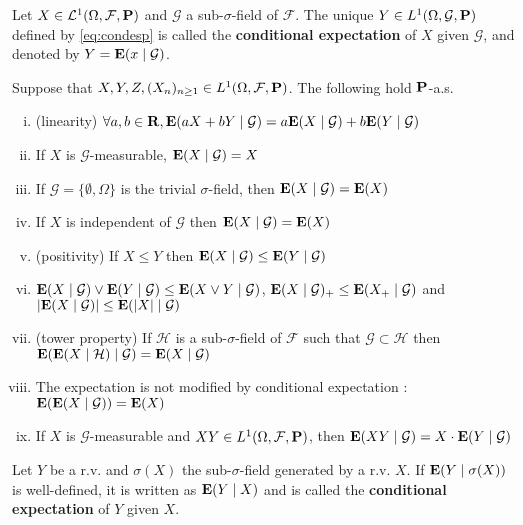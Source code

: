 	\begin{defn}
		Let $X \in \mathcal{L}^1(\Omega, \mathcal{F}, \mathbf{P})$ and $\mathcal{G}$ a sub-$\sigma$-field of $\mathcal{F}$.
		The unique $Y \in L^1(\Omega, \mathcal{G}, \mathbf{P})$ defined by \eqref{eq:condesp} is called the \textbf{conditional expectation} of $X$ given $\mathcal{G}$, and denoted by $Y = \mathbf{E}(x \mid \mathcal{G})$.
	\end{defn}

	\begin{pop}
		Suppose that $X, Y, Z, (X_n)_{n \geq 1} \in L^1(\Omega, \mathcal{F}, \mathbf{P})$.
		The following hold $\mathbf{P}$-a.s.
		\begin{enumerate}[(i)]
			\item (linearity) $\forall a, b \in \mathbf{R}, \mathbf{E}(aX + bY \mid \mathcal{G}) = a \mathbf{E}(X \mid \mathcal{G}) + b \mathbf{E}(Y \mid \mathcal{G})$
			\item If $X$ is $\mathcal{G}$-measurable, $\mathbf{E}(X \mid \mathcal{G}) = X$
			\item If $\mathcal{G} = \{ \emptyset, \Omega \}$ is the trivial $\sigma$-field, then $\mathbf{E}(X \mid \mathcal{G}) = \mathbf{E}(X)$
			\item If $X$ is independent of $\mathcal{G}$ then $\mathbf{E}(X \mid \mathcal{G}) = \mathbf{E}(X)$
			\item (positivity) If $X \leq Y$ then $\mathbf{E}(X \mid \mathcal{G}) \leq \mathbf{E}(Y \mid \mathcal{G})$
			\item $\mathbf{E}(X \mid \mathcal{G}) \vee \mathbf{E}(Y \mid \mathcal{G}) \leq \mathbf{E}(X \vee Y \mid \mathcal{G})$,
				$\mathbf{E}(X \mid \mathcal{G})_+ \leq \mathbf{E}(X_+ \mid \mathcal{G})$ and
				$\left\lvert\mathbf{E}(X \mid \mathcal{G})\right\rvert \leq \mathbf{E}(\left\lvert X\right\rvert \mid \mathcal{G})$
			\item (tower property) If $\mathcal{H}$ is a sub-$\sigma$-field of $\mathcal{F}$ such that $\mathcal{G} \subset \mathcal{H}$ then $\mathbf{E}( \mathbf{E}(X \mid \mathcal{H}) \mid \mathcal{G}) = \mathbf{E}(X \mid \mathcal{G})$
			\item The expectation is not modified by conditional expectation : $\mathbf{E}( \mathbf{E}(X \mid \mathcal{G}) ) = \mathbf{E}(X)$
			\item If $X$ is $\mathcal{G}$-measurable and $XY \in L^1(\Omega, \mathcal{F}, \mathbf{P})$, then $\mathbf{E}(XY \mid \mathcal{G}) = X \cdot \mathbf{E}(Y \mid \mathcal{G})$ 
		\end{enumerate} 
	\end{pop}

	\begin{defn}
		Let $Y$ be a r.v. and $\sigma(X)$ the sub-$\sigma$-field generated by a r.v. $X$.
		If $\mathbf{E}(Y \mid \sigma(X))$ is well-defined, it is written as $\mathbf{E}(Y \mid X)$ and is called the \textbf{conditional expectation} of $Y$ given $X$.
	\end{defn}
